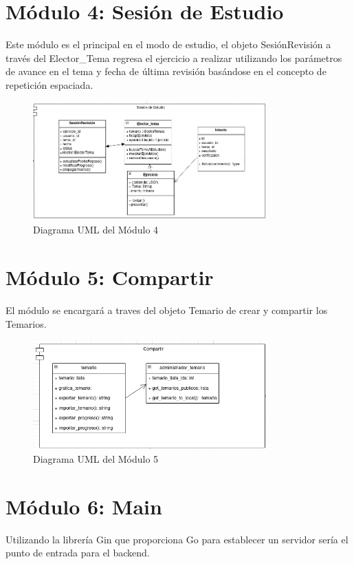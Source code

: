 \documentclass{report}
\begin{document}
\section{Módulo 4: Sesión de Estudio}
Este módulo es el principal en el modo de estudio, el objeto SesiónRevisión a través del Elector\_Tema regresa el ejercicio a realizar utilizando los parámetros de avance en el tema y fecha de última revisión basándose en el concepto de repetición espaciada.

\begin{figure}[H]
    \centering
    \includegraphics[width=0.8\textwidth]{./Diagramas/Modulo4.png}
    \caption{Diagrama UML del Módulo 4}
\end{figure}

\section{Módulo 5: Compartir}
El módulo se encargará a traves del objeto Temario de crear y compartir los Temarios.

\begin{figure}[H]
    \centering
    \includegraphics[width=0.8\textwidth]{./Diagramas/Modulo6.png}
    \caption{Diagrama UML del Módulo 5}
\end{figure}

\section{Módulo 6: Main}
Utilizando la librería Gin que proporciona Go para establecer un servidor sería el punto de entrada para el backend.
\end{document}

